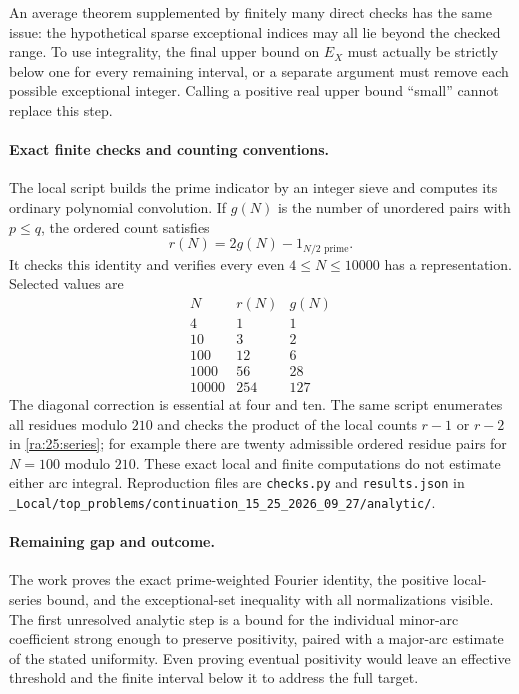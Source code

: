 \documentclass[11pt]{article}
\begin{document}
An average theorem supplemented by finitely many direct checks has the
same issue: the hypothetical sparse exceptional indices may all lie
beyond the checked range. To use integrality, the final upper bound on
$E_X$ must actually be strictly below one for every remaining interval,
or a separate argument must remove each possible exceptional integer.
Calling a positive real upper bound ``small'' cannot replace this step.

\paragraph{Exact finite checks and counting conventions.}
The local script builds the prime indicator by an integer sieve and
computes its ordinary polynomial convolution. If $g(N)$ is the number
of unordered pairs with $p\le q$, the ordered count satisfies
\[
 r(N)=2g(N)-1_{N/2\text{ prime}}.
\]
It checks this identity and verifies every even $4\le N\le10000$ has
a representation. Selected values are
\[
\begin{array}{r|r|r}
N&r(N)&g(N)\\\hline
4&1&1\\10&3&2\\100&12&6\\1000&56&28\\10000&254&127
\end{array}
\]
The diagonal correction is essential at four and ten. The same script
enumerates all residues modulo $210$ and checks the product of the local
counts $r-1$ or $r-2$ in \eqref{ra:25:series}; for example there are
twenty admissible ordered residue pairs for $N=100$ modulo $210$.
These exact local and finite computations do not estimate either arc
integral. Reproduction files are \texttt{checks.py} and
\texttt{results.json} in
\texttt{\_Local/top\_problems/continuation\_15\_25\_2026\_09\_27/analytic/}.

\paragraph{Remaining gap and outcome.}
The work proves the exact prime-weighted Fourier identity, the positive
local-series bound, and the exceptional-set inequality with all
normalizations visible. The first unresolved analytic step is a bound
for the individual minor-arc coefficient strong enough to preserve
positivity, paired with a major-arc estimate of the stated uniformity.
Even proving eventual positivity would leave an effective threshold and
the finite interval below it to address the full target.
\end{document}
